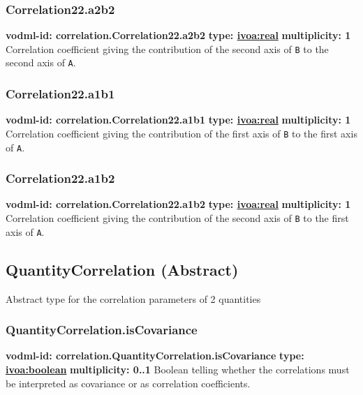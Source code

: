     \subsubsection{Correlation22.a2b2}
      \textbf{vodml-id: correlation.Correlation22.a2b2} \newline
      \textbf{type: \hyperref[sect:ivoa]{ivoa:real}} \newline
      \textbf{multiplicity: 1} \newline 
      Correlation coefficient giving the contribution of the second axis of \texttt{B} to the second axis of \texttt{A}.

    \subsubsection{Correlation22.a1b1}
      \textbf{vodml-id: correlation.Correlation22.a1b1} \newline
      \textbf{type: \hyperref[sect:ivoa]{ivoa:real}} \newline
      \textbf{multiplicity: 1} \newline 
      Correlation coefficient giving the contribution of the first axis of \texttt{B} to the first axis of \texttt{A}.

    \subsubsection{Correlation22.a1b2}
      \textbf{vodml-id: correlation.Correlation22.a1b2} \newline
      \textbf{type: \hyperref[sect:ivoa]{ivoa:real}} \newline
      \textbf{multiplicity: 1} \newline 
      Correlation coefficient giving the contribution of the second axis of \texttt{B} to the first axis of \texttt{A}.

  \subsection{QuantityCorrelation (Abstract)}
  \label{sect:correlation.QuantityCorrelation}
    Abstract type for the correlation parameters of 2 quantities

    \subsubsection{QuantityCorrelation.isCovariance}
      \textbf{vodml-id: correlation.QuantityCorrelation.isCovariance} \newline
      \textbf{type: \hyperref[sect:ivoa]{ivoa:boolean}} \newline
      \textbf{multiplicity: 0..1} \newline 
      Boolean telling whether the correlations must be interpreted as covariance or as correlation coefficients.

